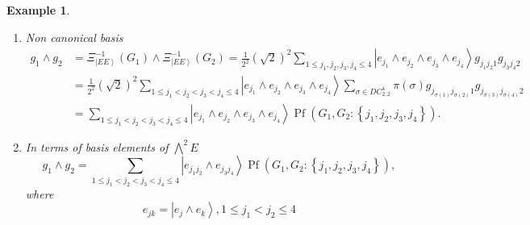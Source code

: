 \documentclass[aps,preprint]{revtex4}%
\newtheorem{example}[theorem]{Example}
\begin{document}
\begin{example}
\begin{enumerate}
\item Non canonical basis
\begin{align*}
g_{1}\wedge g_{2}  &  =\Xi_{\left\vert EE\right\rangle }^{-1}\left(
G_{1}\right)  \wedge\Xi_{\left\vert EE\right\rangle }^{-1}\left(
G_{2}\right)  =\frac{1}{2^{2}}\left(  \sqrt{2}\right)  ^{2}\sum_{1\leq
j_{1},j_{2},j_{3},j_{4}\leq4}\left\vert e_{j_{1}}\wedge e_{j_{2}}\wedge
e_{j_{3}}\wedge e_{j_{4}}\right\rangle g_{j_{1}j_{2}1}g_{j_{3}j_{4}2}\\
&  =\frac{1}{2^{2}}\left(  \sqrt{2}\right)  ^{2}\sum_{1\leq j_{1}<j_{2}%
<j_{3}<j_{4}\leq4}\left\vert e_{j_{1}}\wedge e_{j_{2}}\wedge e_{j_{3}}\wedge
e_{j_{4}}\right\rangle \sum_{\sigma\in DC_{2,2}^{4}}\pi\left(  \sigma\right)
g_{j_{\sigma\left(  1\right)  }j_{\sigma\left(  2\right)  }1}g_{j_{\sigma
\left(  3\right)  }j_{\sigma\left(  4\right)  }2}\\
&  =\sum_{1\leq j_{1}<j_{2}<j_{3}<j_{4}\leq4}\left\vert e_{j_{1}}\wedge
e_{j_{2}}\wedge e_{j_{3}}\wedge e_{j_{4}}\right\rangle \operatorname{Pf}%
\left(  G_{1},G_{2}:\left\{  j_{1},j_{2},j_{3},j_{4}\right\}  \right)  .
\end{align*}


\item In terms of basis elements of $%
{\textstyle\bigwedge\nolimits^{2}}
E$
\begin{equation}
g_{1}\wedge g_{2}=\sum_{1\leq j_{1}<j_{2}<j_{3}<j_{4}\leq4}\left\vert
e_{j_{1}j_{2}}\wedge e_{j_{3}j_{4}}\right\rangle \operatorname{Pf}\left(
G_{1},G_{2}:\left\{  j_{1},j_{2},j_{3},j_{4}\right\}  \right)  ,
\end{equation}
where
\begin{equation}
e_{jk}=\left\vert e_{j}\wedge e_{k}\right\rangle ,1\leq j_{1}<j_{2}\leq4
\end{equation}

\end{enumerate}
\end{example}
\end{document}
